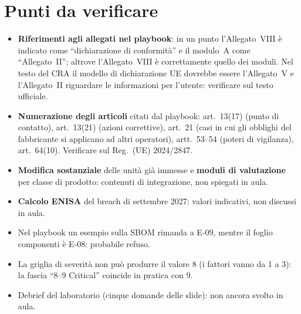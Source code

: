 \section{Punti da verificare}
\begin{verifica}
\begin{itemize}
  \item \textbf{Riferimenti agli allegati nel playbook}: in un punto l'Allegato~VIII è indicato come
    ``dichiarazione di conformità'' e il modulo~A come ``Allegato~II''; altrove l'Allegato~VIII è
    correttamente quello dei moduli. Nel testo del CRA il modello di dichiarazione UE dovrebbe essere
    l'Allegato~V e l'Allegato~II riguardare le informazioni per l'utente: verificare sul testo
    ufficiale.
  \item \textbf{Numerazione degli articoli} citati dal playbook: art.~13(17) (punto di contatto),
    art.~13(21) (azioni correttive), art.~21 (casi in cui gli obblighi del fabbricante si applicano ad
    altri operatori), artt.~53--54 (poteri di vigilanza), art.~64(10). Verificare sul Reg.~(UE)
    2024/2847.
  \item \textbf{Modifica sostanziale} delle unità già immesse e \textbf{moduli di valutazione} per
    classe di prodotto: contenuti di integrazione, non spiegati in aula.
  \item \textbf{Calcolo ENISA} del breach di settembre 2027: valori indicativi, non discussi in aula.
  \item Nel playbook un esempio sulla SBOM rimanda a E-09, mentre il foglio componenti è E-08:
    probabile refuso.
  \item La griglia di severità non può produrre il valore 8 (i fattori vanno da 1 a 3): la fascia
    ``8--9 Critical'' coincide in pratica con 9.
  \item Debrief del laboratorio (cinque domande delle slide): non ancora svolto in aula.
\end{itemize}
\end{verifica}
